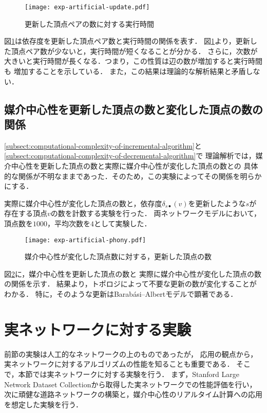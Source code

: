 \begin{figure}[tb]
  \centering
  \texttt{[image: exp-artificial-update.pdf]}
  \caption{更新した頂点ペアの数に対する実行時間}
  \label{fig:exp-artificial-update}
\end{figure}

図\ref{fig:exp-artificial-update}は依存度を更新した頂点ペア数と実行時間の関係を表す．
図\ref{fig:exp-artificial-update}より，更新した頂点ペア数が少ないと，実行時間が短くなることが分かる．
さらに，次数が大きいと実行時間が長くなる．つまり，この性質は辺の数が増加すると実行時間も
増加することを示している．
また，この結果は理論的な解析結果と矛盾しない．

\subsection{媒介中心性を更新した頂点の数と変化した頂点の数の関係}
\ref{subsect:computational-complexity-of-incremental-algorithm}と
\ref{subsect:computational-complexity-of-decremental-algorithm}で
理論解析では，媒介中心性を更新した頂点の数と実際に媒介中心性が変化した頂点の数との
具体的な関係が不明なままであった．そのため，この実験によってその関係を明らかにする．

実際に媒介中心性が変化した頂点の数と，依存度$\delta_{s\bullet}(v)$を更新したような$s$が
存在する頂点$v$の数を計数する実験を行った．
両ネットワークモデルにおいて，頂点数を$1000$，平均次数を$4$として実験した．

\begin{figure}[tb]
  \centering
  \texttt{[image: exp-artificial-phony.pdf]}
  \caption{媒介中心性が変化した頂点数に対する，更新した頂点の数}
  \label{fig:exp-artificial-phony}
\end{figure}

図\ref{fig:exp-artificial-phony}に，媒介中心性を更新した頂点の数と
実際に媒介中心性が変化した頂点の数の関係を示す．
結果より，トポロジによって不要な更新の数が変化することがわかる．
特に，そのような更新はBarab\'{a}si--Albertモデルで顕著である．

\section{実ネットワークに対する実験}
\label{sect:exp-realnet}
前節の実験は人工的なネットワークの上のものであったが，
応用の観点から，実ネットワークに対するアルゴリズムの性能を知ることも重要である．
そこで，本節では実ネットワークに対する実験を行う．
まず，Stanford Large Network Dataset Collection\cite{Leskovec2016}から取得した実ネットワークでの性能評価を行い，
次に頑健な道路ネットワークの構築と，媒介中心性のリアルタイム計算への応用を想定した実験を行う．

